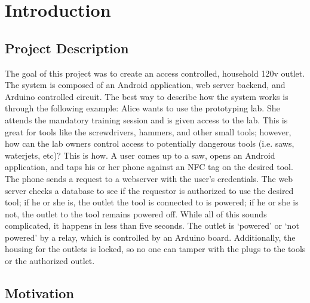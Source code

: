 \documentclass{sigchi}
\begin{document}




\section{Introduction}

\subsection {Project Description}
The goal of this project was to create an access controlled, household 120v outlet. The system is composed of an Android application, web server backend, and Arduino controlled circuit. The best way to describe how the system works is through the following example: Alice wants to use the prototyping lab. She attends the mandatory training session and is given access to the lab. This is great for tools like the screwdrivers, hammers, and other small tools; however, how can the lab owners control access to potentially dangerous tools (i.e. saws, waterjets, etc)? This is how. A user comes up to a saw, opens an Android application, and taps his or her phone against an NFC tag on the desired tool. The phone sends a request to a webserver with the user’s credentials. The web server checks a database to see if the requestor is authorized to use the desired tool; if he or she is, the outlet the tool is connected to is powered; if he or she is not, the outlet to the tool remains powered off. While all of this sounds complicated, it happens in less than five seconds. The outlet is ‘powered’ or ‘not powered’ by a relay, which is controlled by an Arduino board. Additionally, the housing for the outlets is locked, so no one can tamper with the plugs to the tools or the authorized outlet.

\subsection {Motivation}
\end{document}
